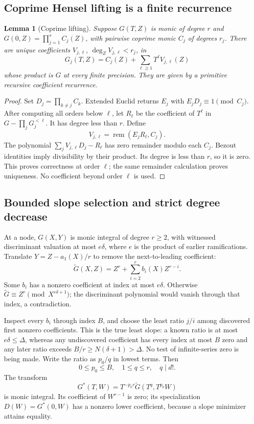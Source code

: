 \documentclass[11pt]{article}
\newtheorem{lemma}[theorem]{Lemma}
\theoremstyle{definition}
\begin{document}
\subsection{Coprime Hensel lifting is a finite recurrence}
\begin{lemma}[Coprime lifting]
\label{lem:hensel}
Suppose \(G(T,Z)\) is monic of degree \(r\) and
\(G(0,Z)=\prod_{j=1}^s C_j(Z)\), with pairwise coprime monic \(C_j\)
of degrees \(r_j\).
There are unique coefficients \(V_{j,\ell}\), \(\deg_ZV_{j,\ell}<r_j\), in
\[
 G_j(T,Z)=C_j(Z)+\sum_{\ell\ge1}T^\ell V_{j,\ell}(Z)
\]
whose product is \(G\) at every finite precision.
They are given by a primitive recursive coefficient recurrence.
\end{lemma}
\begin{proof}
Set \(D_j=\prod_{k\ne j}C_k\). Extended Euclid returns \(E_j\) with
\(E_jD_j\equiv1\pmod{C_j}\).
After computing all orders below \(\ell\), let \(R_\ell\) be the
coefficient of \(T^\ell\) in \(G-\prod_jG_j^{<\ell}\). It has degree
less than \(r\). Define
\[
 V_{j,\ell}=\operatorname{rem}(E_jR_\ell,C_j).
\]
The polynomial \(\sum_j V_{j,\ell}D_j-R_\ell\) has zero remainder modulo
each \(C_j\). Bezout identities imply divisibility by their product.
Its degree is less than \(r\), so it is zero.
This proves correctness at order \(\ell\); the same remainder calculation
proves uniqueness. No coefficient beyond order \(\ell\) is used.
\end{proof}

\subsection{Bounded slope selection and strict degree decrease}
At a node, \(G(X,Y)\) is monic integral of degree \(r\ge2\), with
witnessed discriminant valuation at most \(e\delta\), where \(e\) is
the product of earlier ramifications. Translate
\(Y=Z-a_1(X)/r\) to remove the next-to-leading coefficient:
\[
 \widetilde G(X,Z)=Z^r+\sum_{i=2}^r b_i(X)Z^{r-i}.
\]
Some \(b_i\) has a nonzero coefficient at index at most \(e\delta\).
Otherwise \(\widetilde G\equiv Z^r\pmod{X^{e\delta+1}}\); the discriminant
polynomial would vanish through that index, a contradiction.

Inspect every \(b_i\) through index \(B\), and choose the least ratio \(j/i\)
among discovered first nonzero coefficients. This is the true least slope:
a known ratio is at most \(e\delta\le\Delta\), whereas any undiscovered
coefficient has every index at most \(B\) zero and any later ratio exceeds
\(B/r\ge N(\delta+1)>\Delta\).
No test of infinite-series zero is being made.
Write the ratio as \(p_0/q\) in lowest terms. Then
\[
 0\le p_0\le B,\quad 1\le q\le r,\quad q\mid d!.
\]
The transform
\begin{equation}
 G^*(T,W)=T^{-p_0r}\widetilde G(T^q,T^{p_0}W)
 \label{eq:newton-transform}
\end{equation}
is monic integral. Its coefficient of \(W^{r-1}\) is zero; its
specialization \(D(W)=G^*(0,W)\) has a nonzero lower coefficient, because
a slope minimizer attains equality.
\end{document}
